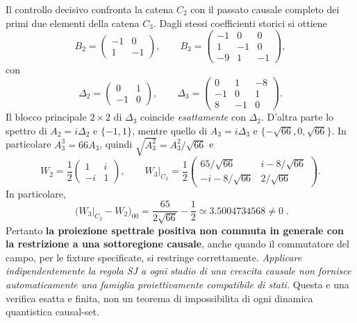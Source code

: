 \documentclass[11pt,a4paper]{article}
\begin{document}
Il controllo decisivo confronta la catena $C_2$ con il passato causale completo dei primi due elementi della catena $C_3$. Dagli stessi coefficienti storici si ottiene
\begin{equation}
 B_2=\begin{pmatrix}-1&0\\1&-1\end{pmatrix},\qquad
 B_3=\begin{pmatrix}-1&0&0\\1&-1&0\\-9&1&-1\end{pmatrix},
 \label{eq:r12az_Bchains}
\end{equation}
con
\begin{equation}
\Delta_2=\begin{pmatrix}0&1\\-1&0\end{pmatrix},\qquad
\Delta_3=\begin{pmatrix}0&1&-8\\-1&0&1\\8&-1&0\end{pmatrix}.
\label{eq:r12az_Dchains}
\end{equation}
Il blocco principale $2\times2$ di $\Delta_3$ coincide \emph{esattamente} con $\Delta_2$. D'altra parte lo spettro di $A_2=i\Delta_2$ e $\{-1,1\}$, mentre quello di $A_3=i\Delta_3$ e $\{-\sqrt{66},0,\sqrt{66}\}$. In particolare $A_3^3=66A_3$, quindi $\sqrt{A_3^2}=A_3^2/\sqrt{66}$ e
\begin{equation}
W_2=\frac12\begin{pmatrix}1&i\\-i&1\end{pmatrix},\qquad
 W_3\big|_{C_2}=\frac12
 \begin{pmatrix}
 65/\sqrt{66}&i-8/\sqrt{66}\\
 -i-8/\sqrt{66}&2/\sqrt{66}
 \end{pmatrix}.
 \label{eq:r12az_Wchains}
\end{equation}
In particolare,
\begin{equation}
\boxed{\;\bigl(W_3\vert_{C_2}-W_2\bigr)_{00}
=\frac{65}{2\sqrt{66}}-\frac12\simeq3.5004734568\ne0\;}.
\label{eq:r12az_witness}
\end{equation}
Pertanto \textbf{la proiezione spettrale positiva non commuta in generale con la restrizione a una sottoregione causale}, anche quando il commutatore del campo, per le fixture specificate, si restringe correttamente. \emph{Applicare indipendentemente la regola SJ a ogni stadio di una crescita causale non fornisce automaticamente una famiglia proiettivamente compatibile di stati.} Questa e una verifica esatta e finita, non un teorema di impossibilita di ogni dinamica quantistica causal-set.
\end{document}

